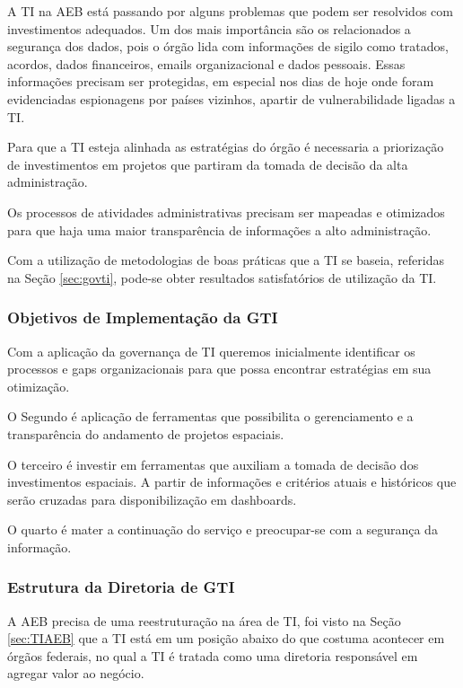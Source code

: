 A TI na AEB está passando por alguns problemas que podem ser resolvidos com investimentos adequados. Um dos mais importância são os relacionados a segurança dos dados, pois o órgão lida com informações de sigilo como tratados, acordos, dados financeiros, emails organizacional e dados pessoais. Essas informações precisam ser protegidas, em especial nos dias de hoje onde foram evidenciadas espionagens por países vizinhos, apartir de vulnerabilidade ligadas a TI.

Para que a TI esteja alinhada as estratégias do órgão é necessaria a priorização de investimentos em projetos que partiram da tomada de decisão da alta administração.

Os processos de atividades administrativas precisam ser mapeadas e otimizados para que haja uma maior transparência de informações a alto administração.

Com a utilização de metodologias de boas práticas que a TI se baseia, referidas na Seção \ref{sec:govti}, pode-se obter resultados satisfatórios de utilização da TI.

\subsubsection{Objetivos de Implementação da GTI }

Com a aplicação da governança de TI queremos inicialmente identificar os processos e gaps organizacionais para que possa encontrar estratégias em sua otimização.

O Segundo é aplicação de ferramentas que  possibilita o gerenciamento e a transparência do andamento de projetos espaciais.

O terceiro é investir em ferramentas que auxiliam a tomada de decisão dos investimentos espaciais. A partir de informações e critérios atuais e históricos que serão cruzadas para disponibilização em dashboards.

O quarto é mater a continuação do serviço e preocupar-se com a segurança da informação.

\subsubsection{Estrutura da Diretoria de GTI}\label{subsec:estruturaGTI}

A AEB precisa de uma reestruturação na área de TI, foi visto na Seção \ref{sec:TIAEB} que a TI está em um posição abaixo do que costuma acontecer em órgãos federais, no qual a TI é tratada como uma diretoria responsável em agregar valor ao negócio.

